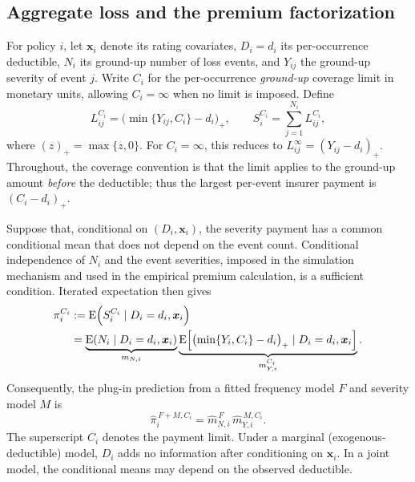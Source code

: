\documentclass[11pt]{article}
\begin{document}
{\subsection{Aggregate loss and the premium factorization}
\label{app:premium-loss}

For policy $i$, let $\boldsymbol{x}_i$ denote its rating covariates,
$D_i=d_i$ its per-occurrence deductible, $N_i$ its ground-up number of loss
events, and $Y_{ij}$ the ground-up severity of event $j$. Write $C_i$ for
the per-occurrence \emph{ground-up} coverage limit in monetary units, allowing
$C_i=\infty$ when no limit is imposed. Define
\begin{equation}
  L_{ij}^{C_i}=\bigl(\min\{Y_{ij},C_i\}-d_i\bigr)_{+},
  \qquad
  S_i^{C_i}=\sum_{j=1}^{N_i}L_{ij}^{C_i},
  \label{eq:app-premium-loss}
\end{equation}
where $(z)_{+}=\max\{z,0\}$. For $C_i=\infty$, this reduces to
$L_{ij}^{\infty}=(Y_{ij}-d_i)_{+}$. Throughout, the coverage convention is
that the limit applies to the ground-up amount \emph{before} the deductible;
thus the largest per-event insurer payment is $(C_i-d_i)_{+}$.

Suppose that, conditional on $(D_i,\boldsymbol{x}_i)$, the severity payment
has a common conditional mean that does not depend on the event count.
Conditional independence of $N_i$ and the event severities, imposed in the
simulation mechanism and used in the empirical premium calculation, is a
sufficient condition. Iterated expectation then gives
\begin{align}
 \pi_i^{C_i}
  &:=\operatorname{E}\!\left(S_i^{C_i}\mid D_i=d_i,\boldsymbol{x}_i\right)
     \notag\\
  &=\underbrace{\operatorname{E}\!\left(N_i\mid D_i=d_i,
      \boldsymbol{x}_i\right)}_{m_{N,i}}
    \underbrace{\operatorname{E}\!\left[
      \bigl(\min\{Y_i,C_i\}-d_i\bigr)_{+}
      \mid D_i=d_i,\boldsymbol{x}_i\right]}_{m_{Y,i}^{C_i}}
      .\label{eq:app-premium-product}
\end{align}
Consequently, the plug-in prediction from a fitted frequency model $F$
and severity model $M$ is
\begin{equation}
 \widehat\pi_i^{\,F+M,C_i}
    =\widehat m_{N,i}^{\,F}\,\widehat m_{Y,i}^{\,M,C_i}.
 \label{eq:app-premium-plugin}
\end{equation}
The superscript $C_i$ denotes the payment limit. Under a marginal
(exogenous-deductible) model, $D_i$ adds no information after conditioning
on $\boldsymbol{x}_i$. In a joint model, the conditional means may depend
on the observed deductible.

}
\end{document}
